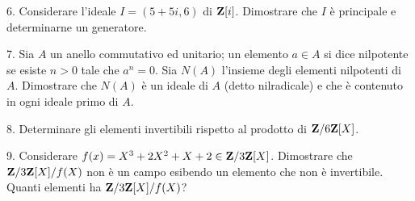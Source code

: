\item{6.} Considerare l'ideale $I=(5+5i,6)$ di ${\bf Z}[i]$. Dimostrare che $I$ \`e principale
e determinarne un generatore.
\vv

\item{7.} Sia $A$ un anello commutativo ed unitario; un elemento $a\in A$ si dice
nilpotente se esiste $n > 0$ tale che $a^n = 0$. Sia $N(A)$ l’insieme degli
elementi nilpotenti di $A$. Dimostrare che $N(A)$ \`e un ideale di $A$ (detto nilradicale)
e che \`e contenuto in ogni ideale primo di $A$.
\ve \vs

\item{8.} Determinare gli elementi invertibili rispetto al prodotto di ${\bf Z}/6{\bf Z}[X]$.
\vv\vv

\item{9.} Considerare $f(x)=X^3+2X^2+X+2\in{\bf Z}/3{\bf Z}[X]$. Dimostrare che ${\bf Z}/3{\bf Z}[X]/f(X)$
non \`e un campo esibendo un elemento che non \`e invertibile. Quanti elementi ha ${\bf Z}/3{\bf Z}[X]/f(X)$?
\ \vst

 \bye
